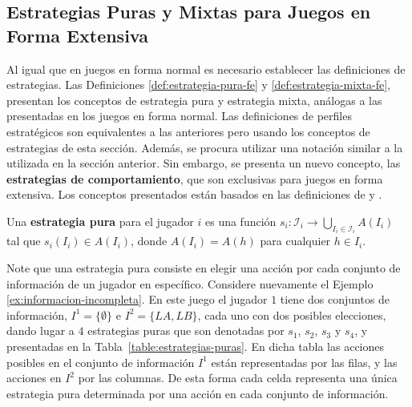 \begin{figure}
\begin{center}
\end{center}
\end{figure}

\subsection{Estrategias Puras y Mixtas para Juegos en Forma Extensiva}

Al igual que en juegos en forma normal es necesario establecer las definiciones de estrategias. Las Definiciones \ref{def:estrategia-pura-fe} y \ref{def:estrategia-mixta-fe}, presentan los conceptos de estrategia pura y estrategia mixta, análogas a las presentadas en los juegos en forma normal. Las definiciones de perfiles estratégicos son equivalentes a las anteriores pero usando los conceptos de estrategias de esta sección. Además, se procura utilizar una notación similar a la utilizada en la sección anterior. Sin embargo, se presenta un nuevo concepto, las \textbf{estrategias de comportamiento}, que son exclusivas para juegos en forma extensiva. Los conceptos presentados están basados en las definiciones de \cite{bib:conceptos-basicos} y \cite{bib:course-game-theory}.

\begin{definition}
\label{def:estrategia-pura-fe}
Una \textbf{estrategia pura} para el jugador $i$ es una función $s_i : \mathcal{I}_i \rightarrow \bigcup_{I_i \in \mathcal{I}_i}A(I_i)$ tal que $s_i(I_i) \in A(I_i)$, donde $A(I_i) = A(h)$ para cualquier $h \in I_i$. 
\end{definition}

Note que una estrategia pura consiste en elegir una acción por cada conjunto de información de un jugador en específico. Considere nuevamente el Ejemplo \ref{ex:informacion-incompleta}. En este juego el jugador $1$ tiene dos conjuntos de información, $I^1 = \{\emptyset\}$ e $I^2 = \{LA, LB\}$, cada uno con dos posibles elecciones, dando lugar a $4$ estrategias puras que son denotadas por $s_1$, $s_2$, $s_3$ y $s_4$, y presentadas en la Tabla~\ref{table:estrategias-puras}. En dicha tabla las acciones posibles en el conjunto de información $I^1$ están representadas por las filas, y las acciones en $I^2$ por las columnas. De esta forma cada celda representa una única estrategia pura determinada por una acción en cada conjunto de información.

